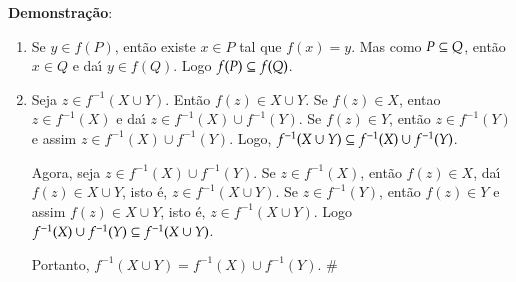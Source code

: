 \textbf{Demonstra{\c c}{\~a}o}: 
\begin{enumerate}
\item Se $y \in f(P)$, ent{\~a}o existe $x \in P$ tal que $f(x) = y$. Mas como $P \subseteq Q$, ent{\~a}o $x \in Q$ e da{\'\i} $y \in f(Q)$. Logo $f(P) \subseteq f(Q)$.

\item Seja $z \in f^{-1}(X \cup Y)$. Ent{\~a}o $f(z) \in X \cup Y$. Se $f(z) \in X$, entao $z \in f^{-1}(X)$ e da{\'\i} $z \in f^{-1}(X) \cup f^{-1}(Y)$. Se $f(z) \in Y$, ent{\~a}o $z \in f^{-1}(Y)$ e assim $z \in f^{-1}(X) \cup f^{-1}(Y)$. Logo, $f^{-1}(X \cup Y) \subseteq f^{-1}(X) \cup f^{-1}(Y)$.

Agora, seja $z \in f^{-1}(X) \cup f^{-1}(Y)$. Se $z \in f^{-1}(X)$, ent{\~a}o $f(z) \in X$, da{\'\i} $f(z) \in X \cup Y$, isto {\'e}, $z \in f^{-1}(X \cup Y)$. Se $z \in f^{-1}(Y)$, ent{\~a}o $f(z) \in Y$ e assim $f(z) \in X \cup Y$, isto {\'e}, $z \in f^{-1}(X \cup Y)$. Logo $f^{-1}(X) \cup f^{-1}(Y) \subseteq f^{-1}(X \cup Y)$.

Portanto, $f^{-1}(X \cup Y) = f^{-1}(X) \cup f^{-1}(Y)$. \#
\end{enumerate}